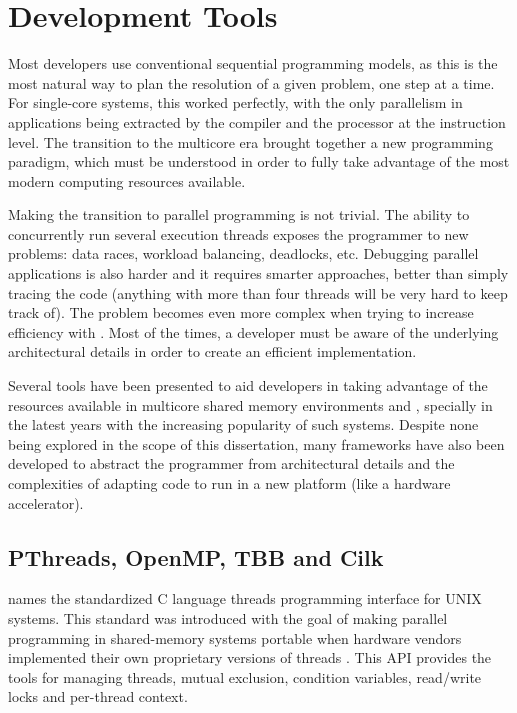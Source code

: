 \documentclass[../thesis]{subfiles}
\begin{document}
		\section{Development Tools}
		Most developers use conventional sequential programming models, as this is the most natural way to plan the resolution of a given problem, one step at a time. For single-core systems, this worked perfectly, with the only parallelism in applications being extracted by the compiler and the processor at the instruction level. The transition to the multicore era brought together a new programming paradigm, which must be understood in order to fully take advantage of the most modern computing resources available.

		Making the transition to parallel programming is not trivial. The ability to concurrently run several execution threads exposes the programmer to new problems: data races, workload balancing, deadlocks, etc. Debugging parallel applications is also harder and it requires smarter approaches, better than simply tracing the code (anything with more than four threads will be very hard to keep track of). The problem becomes even more complex when trying to increase efficiency with \hetplats. Most of the times, a developer must be aware of the underlying architectural details in order to create an efficient implementation.

		Several tools have been presented to aid developers in taking advantage of the resources available in multicore shared memory environments and \hetplats, specially in the latest years with the increasing popularity of such systems. Despite none being explored in the scope of this dissertation, many frameworks have also been developed to abstract the programmer from architectural details and the complexities of adapting code to run in a new platform (like a hardware accelerator).

		\subsection{PThreads, OpenMP, TBB and Cilk}
		\pthreads names the standardized C language threads programming interface for UNIX systems. This standard was introduced with the goal of making parallel programming in shared-memory systems portable when hardware vendors implemented their own proprietary versions of threads \cite{LLNL:Barney:pthreads}. This API provides the tools for managing threads, mutual exclusion, condition variables, read/write locks and per-thread context.
\end{document}
